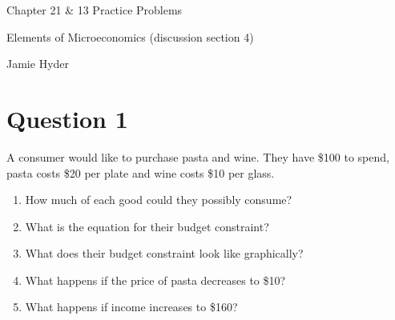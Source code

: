 \documentclass[12pt]{article}
\begin{document}
\begin{center}
\Large Chapter 21 \& 13 Practice Problems

\medskip

\normalsize Elements of Microeconomics (discussion section 4)

\medskip

\small Jamie Hyder
\end{center}

\section*{Question 1}
A consumer would like to purchase pasta and wine. They have \$100 to spend, pasta costs \$20 per plate and wine costs \$10 per glass.
\begin{enumerate}
    \item How much of each good could they possibly consume?
    \item What is the equation for their budget constraint?
    \item What does their budget constraint look like graphically?
    \item What happens if the price of pasta decreases to \$10?
    \item What happens if income increases to \$160?
\end{enumerate}
\end{document}
